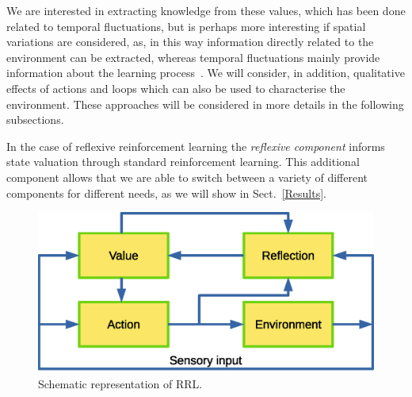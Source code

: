 \documentclass{article}
\begin{document}
We are interested in extracting knowledge from these values, which has been done
related to temporal fluctuations, but %
is perhaps more interesting if spatial variations are considered, as, in this way information directly
related to the environment can be extracted, whereas temporal fluctuations mainly provide
information about the learning process~\cite{herrmann1995efficient}. We will consider, in addition, qualitative effects of actions and loops which can also be used to characterise the environment. These approaches will be considered in more details 
in the following subsections.

In the case of reflexive reinforcement learning the \emph{reflexive component} informs state valuation through standard reinforcement learning. This additional component allows that we are able to switch between a variety of different components for different needs, as we will show in Sect.~\ref{Results}.

\begin{figure}[ht] 
\centering
\includegraphics[scale=0.5]{pics/figure1.eps}
	\caption{Schematic representation of RRL.\label{rrlfig}}
\end{figure}
\end{document}
